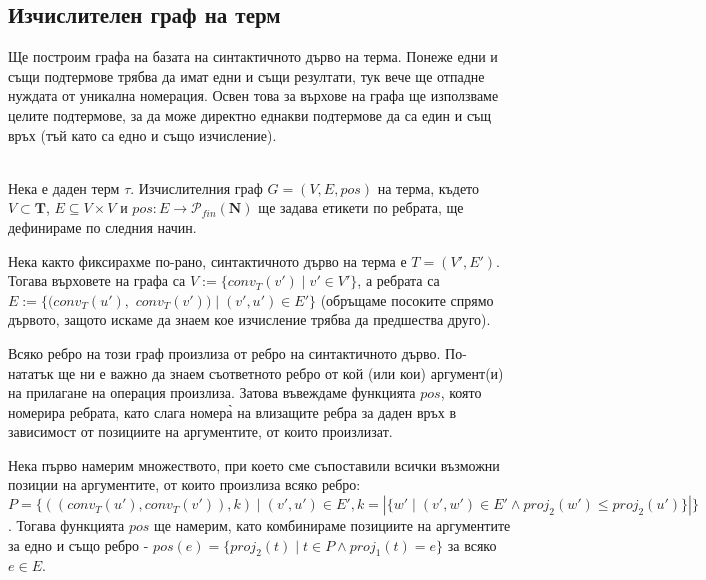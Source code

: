 \documentclass[12pt,twoside,a4paper]{article}
\begin{document}
	\subsection{Изчислителен граф на терм}
	Ще построим графа на базата на синтактичното дърво на терма. Понеже едни и същи подтермове трябва да имат едни и същи резултати, тук вече ще отпадне нуждата от уникална номерация. Освен това за върхове на графа ще използваме целите подтермове, за да може директно еднакви подтермове да са един и същ връх (тъй като са едно и също изчисление).
	
	\begin{definition}\label{def:graph}~\\
		\indent Нека е даден терм $\tau$. Изчислителния граф $G=(V,E,pos)$ на терма, където $V \subset \mathbf{T}$, $E \subseteq V \times V$ и $pos \colon E \to \mathcal{P}_{fin}(\mathbf{N})$ ще задава етикети по ребрата, ще дефинираме по следния начин.
		
		Нека както фиксирахме по-рано, синтактичното дърво на терма е $T=(V',E')$. Тогава върховете на графа са $V:=\{conv_T(v') \mid v' \in V'\}$, а ребрата са $E:=\{(conv_T(u'),$ $conv_T(v')) \mid (v', u') \in E'\}$ (обръщаме посоките спрямо дървото, защото искаме да знаем кое изчисление трябва да предшества друго).
		
		Всяко ребро на този граф произлиза от ребро на синтактичното дърво. По-нататък ще ни е важно да знаем съответното ребро от кой (или кои) аргумент(и) на прилагане на операция произлиза. Затова въвеждаме функцията $pos$, която номерира ребрата, като слага номера̀ на влизащите ребра за даден връх в зависимост от позициите на аргументите, от които произлизат.
		
		Нека първо намерим множеството, при което сме съпоставили всички възможни позиции на аргументите, от които произлиза всяко ребро: $P=\{((conv_T(u'),conv_T(v')),k) \mid (v',u') \in E', k=|\{w' \mid (v',w') \in E' \land proj_2(w') \le proj_2(u')\}|\}$. Тогава функцията $pos$ ще намерим, като комбинираме позициите на аргументите за едно и също ребро - $pos(e)=\{proj_2(t) \mid t \in P \land proj_1(t)=e\}$ за всяко $e \in E$.
	\end{definition}
	
\end{document}
